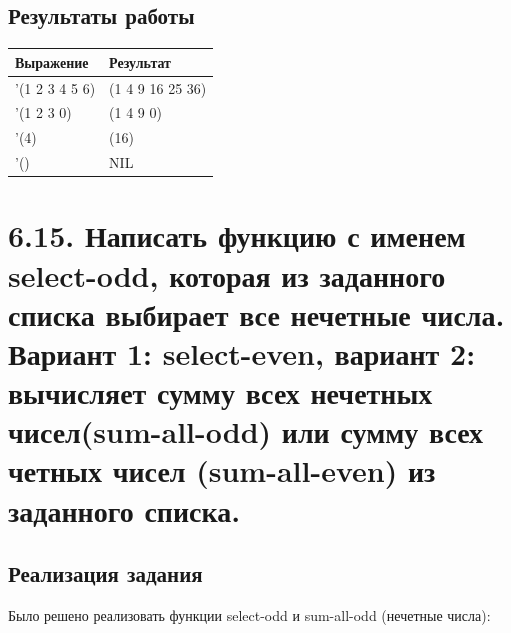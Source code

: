 \documentclass[a4paper,12pt]{article}
\begin{document}
 	\subsection*{Результаты работы}
 	
 	 	 	\begin{table} [h!]
 		\begin{center}
 			\begin{tabular}{|l|l|}
 				\hline
 				{\bf  Выражение} & {\bf Результат} \\
 				\hline
 				{'(1 2 3 4 5 6)} & (1 4 9 16 25 36)\\
 				\hline
 				{'(1 2 3 0)} & (1 4 9 0)\\
 				\hline
 				{'(4)} & (16)\\
 				\hline
 				{'()} & NIL\\
 				\hline
 			\end{tabular}  
 			\label{m2}
 		\end{center}
 	\end{table}
 	
 	\newpage
 	
 	\section*{6.15. Написать функцию с именем select-odd, которая из заданного
списка выбирает все нечетные числа. Вариант 1: select-even, 
вариант 2: вычисляет сумму всех нечетных чисел(sum-all-odd) или сумму всех четных чисел (sum-all-even) из заданного списка.
 	}
 	
 	\subsection*{Реализация задания}
 	
 	Было решено реализовать функции select-odd и sum-all-odd (нечетные числа):
 	
\end{document}
